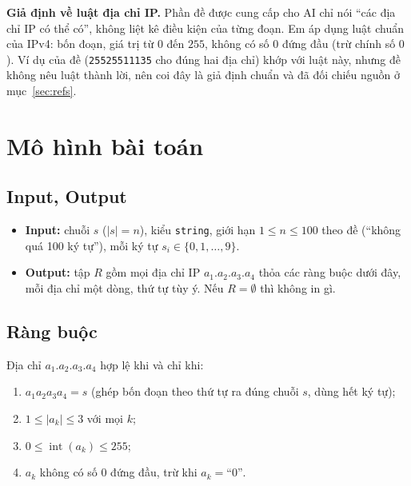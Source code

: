 \documentclass[12pt,a4paper]{article}
\begin{document}
\textbf{Giả định về luật địa chỉ IP.} Phần đề được cung cấp cho AI chỉ nói ``các địa chỉ IP có thể có'', không liệt kê điều kiện của từng đoạn. Em áp dụng luật chuẩn của IPv4: bốn đoạn, giá trị từ $0$ đến $255$, không có số $0$ đứng đầu (trừ chính số $0$). Ví dụ của đề (\texttt{25525511135} cho đúng hai địa chỉ) khớp với luật này, nhưng đề không nêu luật thành lời, nên coi đây là giả định chuẩn và đã đối chiếu nguồn ở mục~\ref{sec:refs}.

\section{Mô hình bài toán}\label{sec:model}

\subsection{Input, Output}
\begin{itemize}
    \item \textbf{Input:} chuỗi $s$ ($|s| = n$), kiểu \texttt{string}, giới hạn $1 \le n \le 100$ theo đề (``không quá 100 ký tự''), mỗi ký tự $s_i \in \{0, 1, \dots, 9\}$.
    \item \textbf{Output:} tập $R$ gồm mọi địa chỉ IP $a_1.a_2.a_3.a_4$ thỏa các ràng buộc dưới đây, mỗi địa chỉ một dòng, thứ tự tùy ý. Nếu $R = \emptyset$ thì không in gì.
\end{itemize}

\subsection{Ràng buộc}
Địa chỉ $a_1.a_2.a_3.a_4$ hợp lệ khi và chỉ khi:
\begin{enumerate}
    \item $a_1 a_2 a_3 a_4 = s$ (ghép bốn đoạn theo thứ tự ra đúng chuỗi $s$, dùng hết ký tự);
    \item $1 \le |a_k| \le 3$ với mọi $k$;
    \item $0 \le \operatorname{int}(a_k) \le 255$;
    \item $a_k$ không có số $0$ đứng đầu, trừ khi $a_k = \text{``0''}$.
\end{enumerate}
\end{document}
